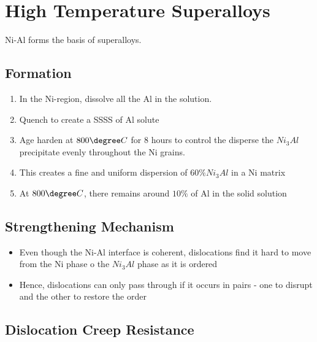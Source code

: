 \section{High Temperature Superalloys} %
\label{sec:high_temperature_superalloys}

Ni-Al forms the basis of superalloys.

\subsection{Formation} %
\label{sub:formation}

\begin{enumerate}
  \item In the Ni-region, dissolve all the Al in the solution.
  \item Quench to create a SSSS of Al solute
  \item Age harden at $800\degree C$ for 8 hours to control the disperse the $Ni_3Al$ precipitate evenly throughout the Ni grains.
  \item This creates a fine and uniform dispersion of $60\% Ni_3Al$  in a Ni matrix
  \item At $800\degree C$, there remains around $10\%$ of Al in the solid solution
\end{enumerate}


\subsection{Strengthening Mechanism} %
\label{sub:strenghtening_mechanism}

\begin{itemize}
  \item Even though the Ni-Al interface is coherent, dislocations find it hard to move from the Ni phase o the $Ni_3Al$ phase as it is ordered
  \item Hence, dislocations can only pass through if it occurs in pairs - one to disrupt and the other to restore the order
\end{itemize}


\subsection{Dislocation Creep Resistance} %
\label{sub:dislocation_creep_resistance}


